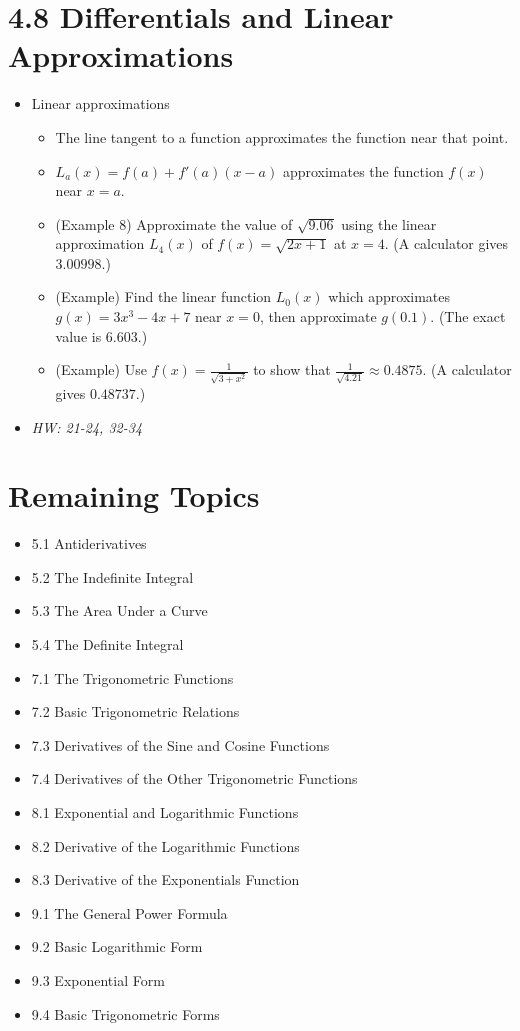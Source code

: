 \documentclass[11pt]{article}
\begin{document}
\section*{4.8 Differentials and Linear Approximations}

\begin{itemize}
\item Linear approximations
  \begin{itemize}
    \item The line tangent to a function approximates the function near that
          point.
    \item \(L_a(x)=f(a)+f'(a)(x-a)\) approximates the function \(f(x)\) near \(x=a\).
    \item (Example 8) Approximate the value of \(\sqrt{9.06}\) using the
          linear approximation \(L_4(x)\) of \(f(x)=\sqrt{2x+1}\) at \(x=4\).
          (A calculator gives \(3.00998\).)
    \item (Example) Find the linear function \(L_0(x)\) which approximates
          \(g(x)=3x^3-4x+7\) near \(x=0\), then approximate \(g(0.1)\).
          (The exact value is \(6.603\).)
    \item (Example) Use \(f(x)=\frac{1}{\sqrt{3+x^2}}\) to show
          that \(\frac{1}{\sqrt{4.21}}\approx 0.4875\).
          (A calculator gives \(0.48737\).)
  \end{itemize}
\item\textit{
  HW: 21-24, 32-34
}
\end{itemize}



\section*{Remaining Topics}

\begin{itemize}
  \item 5.1 Antiderivatives
  \item 5.2 The Indefinite Integral
  \item 5.3 The Area Under a Curve
  \item 5.4 The Definite Integral
  \item 7.1 The Trigonometric Functions
  \item 7.2 Basic Trigonometric Relations
  \item 7.3 Derivatives of the Sine and Cosine Functions
  \item 7.4 Derivatives of the Other Trigonometric Functions
  \item 8.1 Exponential and Logarithmic Functions
  \item 8.2 Derivative of the Logarithmic Functions
  \item 8.3 Derivative of the Exponentials Function
  \item 9.1 The General Power Formula
  \item 9.2 Basic Logarithmic Form
  \item 9.3 Exponential Form
  \item 9.4 Basic Trigonometric Forms
\end{itemize}
\end{document}
